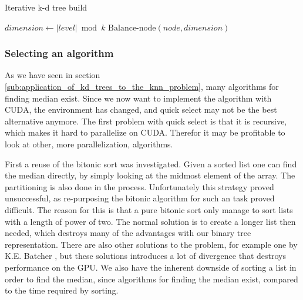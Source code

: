 \begin{algorithm}
\caption{Iterative k-d tree build}
\label{alg:iterativ_tree_build}
\begin{algorithmic}
                \State $dimension \gets |level| \bmod k$ 
                \State $\text{Balance-node}(node, dimension)$
            \EndFor
        \EndFor
    \EndFunction
\end{algorithmic}
\end{algorithm}






\subsubsection{Selecting an algorithm} %
\label{ssub:selecting_a_algorithm}



As we have seen in section \ref{sub:application_of_kd_trees_to_the_knn_problem}, many algorithms for finding median exist. Since we now want to implement the algorithm with CUDA, the environment has changed, and quick select may not be the best alternative anymore. The first problem with quick select is that it is recursive, which makes it hard to parallelize on CUDA. Therefor it may be profitable to look at other, more parallelization, algorithms.


First a reuse of the bitonic sort was investigated. Given a sorted list one can find the median directly, by simply looking at the midmost element of the array. The partitioning is also done in the process. Unfortunately this strategy proved unsuccessful, as re-purposing the bitonic algorithm for such an task proved difficult. The reason for this is that a pure bitonic sort only manage to sort lists with a length of power of two. The normal solution is to create a longer list then needed, which destroys many of the advantages with our binary tree representation. There are also other solutions to the problem, for example one by K.E. Batcher \cite{Batcher:1968}, but these solutions introduces a lot of divergence that destroys performance on the GPU. We also have the inherent downside of sorting a list in order to find the median, since  algorithms for finding the median exist, compared to the  time required by sorting.


